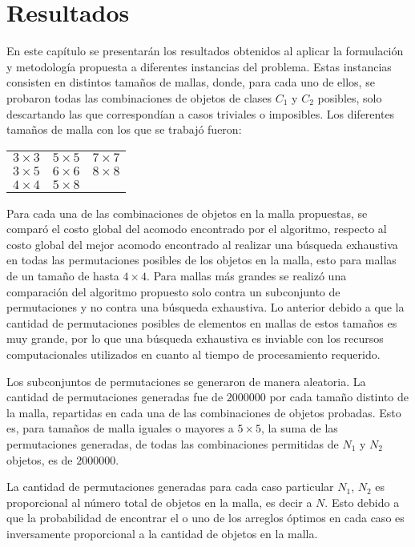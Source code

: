\chapter{Resultados}
\label{chap:resultados}
%
%
En este capítulo se presentarán los resultados obtenidos al aplicar la formulación y metodología propuesta a diferentes instancias del problema.
Estas instancias consisten en distintos tamaños de mallas, donde, para cada uno de ellos, se probaron todas las combinaciones de objetos de clases $C_1$ y $C_2$ posibles, solo descartando las que correspondían a casos triviales o imposibles.
Los diferentes tamaños de malla con los que se trabajó fueron:
%
\begin{center}
\renewcommand{\arraystretch}{1.2}%
\begin{tabular}{w{c}{2cm} w{c}{2cm} w{c}{2cm}}
	\toprule[\arrayrulewidth]
	\toprule[\arrayrulewidth]
	$3\times 3$ & $5\times 5$ & $7\times 7$ \\
	$3\times 5$ & $6\times 6$ & $8\times 8$ \\
	$4\times 4$ & $5\times 8$ & \\
	\bottomrule[\arrayrulewidth]
	\bottomrule[\arrayrulewidth]
\end{tabular}
\end{center}
%
Para cada una de las combinaciones de objetos en la malla propuestas, se comparó el costo global del acomodo encontrado por el algoritmo, respecto al costo global del mejor acomodo encontrado al realizar una búsqueda exhaustiva en todas las permutaciones posibles de los objetos en la malla, esto para mallas de un tamaño de hasta $4\times 4$.
Para mallas más grandes se realizó una comparación del algoritmo propuesto solo contra un subconjunto de permutaciones y no contra una búsqueda exhaustiva.
Lo anterior debido a que la cantidad de permutaciones posibles de elementos en mallas de estos tamaños es muy grande, por lo que una búsqueda exhaustiva es inviable con los recursos computacionales utilizados en cuanto al tiempo de procesamiento requerido.

Los subconjuntos de permutaciones se generaron de manera aleatoria.
La cantidad de permutaciones generadas fue de $\num{2000000}$ por cada tamaño distinto de la malla, repartidas en cada una de las combinaciones de objetos probadas.
Esto es, para tamaños de malla iguales o mayores a $5 \times 5$, la suma de las permutaciones generadas, de todas las combinaciones permitidas de $N_1$ y $N_2$ objetos, es de $\num{2000000}$.

La cantidad de permutaciones generadas para cada caso particular $N_1$, $N_2$ es proporcional al número total de objetos en la malla, es decir a $N$.
Esto debido a que la probabilidad de encontrar el o uno de los arreglos óptimos en cada caso es inversamente proporcional a la cantidad de objetos en la malla.

